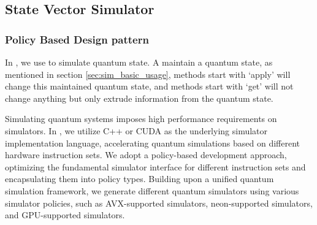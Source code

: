 
\subsection{State Vector Simulator}
\label{sec_state_vec}
\subsubsection{Policy Based Design pattern}
In \MindQuantum, we use \Simulator to simulate quantum state. A \Simulator maintain a quantum state, as mentioned in section \ref{sec:sim_basic_usage}, methods start with `apply' will change this maintained quantum state, and methods start with `get' will not change anything but only extrude information from the quantum state.

Simulating quantum systems imposes high performance requirements on simulators. In \MindQuantum, we utilize C++ or CUDA as the underlying simulator implementation language, accelerating quantum simulations based on different hardware instruction sets. We adopt a policy-based development approach, optimizing the fundamental simulator interface for different instruction sets and encapsulating them into policy types. Building upon a unified quantum simulation framework, we generate different quantum simulators using various simulator policies, such as AVX-supported simulators, neon-supported simulators, and GPU-supported simulators.

